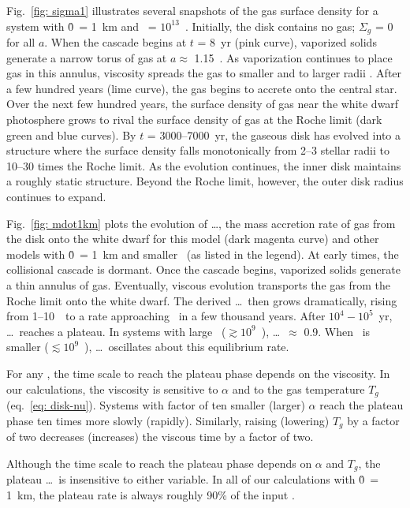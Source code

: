 \documentclass[12pt,preprint]{aastex}
\begin{document}
Fig.~\ref{fig: sigma1} illustrates several snapshots of the gas surface density for a 
system with \r0\ = 1~km and \mdotz\ = $10^{13}$~\gs. Initially, the disk contains no
gas; $\Sigma_g$ = 0 for all $a$.  When the cascade begins at $t$ = 8~yr (pink curve), 
vaporized solids generate a narrow torus of gas at $a \approx$ 1.15~\rsun. As vaporization
continues to place gas in this annulus, viscosity spreads the gas to smaller and to larger 
radii \citep[see also][]{lbp1974}. After a few hundred years (lime curve), the gas begins 
to accrete onto the central star. Over the next few hundred years, the surface density of
gas near the white dwarf photosphere grows to rival the surface density of gas at the Roche
limit (dark green and blue curves). By $t$ = 3000--7000~yr, the gaseous disk has evolved 
into a structure where the surface density falls monotonically from 2--3 stellar radii to 
10--30 times the Roche limit. As the evolution continues, the inner disk maintains a roughly 
static structure. Beyond the Roche limit, however, the outer disk radius continues to expand.

Fig.~\ref{fig: mdot1km} plots the evolution of \mdots, the mass accretion rate of gas from 
the disk onto the white dwarf for this model (dark magenta curve) and other models with 
\r0\ = 1~km and smaller \mdotz\ (as
listed in the legend). At early times, the collisional cascade is dormant. Once the 
cascade begins, vaporized solids generate a thin annulus of gas. Eventually, viscous 
evolution transports the gas from the Roche limit onto the white dwarf. The derived
\mdots\ then grows dramatically, rising from 1--10~\gs\ to a rate approaching \mdotz\ in 
a few thousand years. After $10^4 - 10^5$~yr, \mdots\ reaches a plateau. In systems 
with large \mdotz\ ($\gtrsim 10^9$~\gs), \mdots\ $\approx$ 0.9\mdotz. When \mdotz\ is 
smaller ($\lesssim 10^9$~\gs), \mdots\ oscillates about this equilibrium rate.

For any \mdotz, the time scale to reach the plateau phase depends on the viscosity. In
our calculations, the viscosity is sensitive to $\alpha$ and to the gas temperature 
$T_g$ (eq.~\ref{eq: disk-nu}).  Systems with factor of ten smaller (larger) $\alpha$ 
reach the plateau phase ten times more slowly (rapidly). Similarly, raising (lowering)
$T_g$ by a factor of two decreases (increases) the viscous time by a factor of two. 

Although the time scale to reach the plateau phase depends on $\alpha$ and $T_g$, the 
plateau \mdots\ is insensitive to either variable. In all of our calculations with 
\r0\ = 1~km, the plateau rate is always roughly 90\% of the input \mdotz. 
\end{document}
